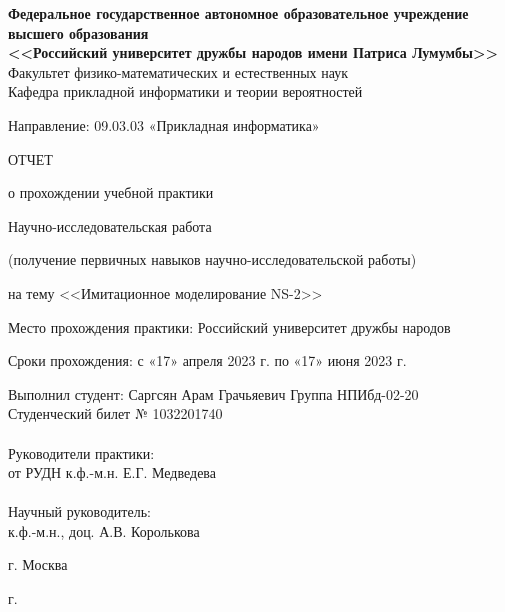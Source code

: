 \begin{titlepage}
  
  \begin{center}
    \textbf{%
      Федеральное государственное автономное образовательное
      учреждение высшего образования\\
      <<Российский университет дружбы народов имени Патриса Лумумбы>>}\\[5mm]
    Факультет физико-математических и естественных наук \\[2mm]
    Кафедра прикладной информатики и теории вероятностей

    \vfill

    
    
    \vfill

    Направление: 09.03.03 «Прикладная информатика»

    \vfill

    ОТЧЕТ

    \bigskip
    
    о прохождении учебной практики

    Научно-исследовательская работа
    
    (получение первичных навыков научно-исследовательской работы)

    на тему <<Имитационное моделирование NS-2>>

    \medskip
    
    Место прохождения практики: Российский университет дружбы народов
   
    Сроки прохождения: с «17» апреля 2023 г. по «17» июня 2023 г.
  \end{center}

\vfill

  \begin{minipage}{.45\textwidth}
    Выполнил студент: Саргсян Арам Грачьяевич
    Группа НПИбд-02-20\\
    Студенческий билет № 1032201740 \\ \\
    Руководители практики: \\
    от РУДН к.ф.-м.н. Е.Г. Медведева \\ \\
    
    Научный руководитель: \\
    к.ф.-м.н., доц. А.В. Королькова 
  \end{minipage}%
  \hfill
  
   


\vfill

\centering
г. Москва

 г.
\end{titlepage}
